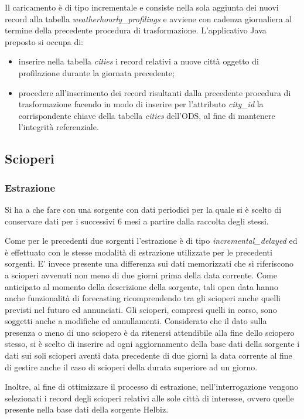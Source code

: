 Il caricamento è di tipo incrementale e consiste nella sola aggiunta dei nuovi
record alla tabella \textit{weather\-hourly\_profilings} e avviene con cadenza
giornaliera al termine della precedente procedura di trasformazione.
L'applicativo Java preposto si occupa di:
\begin{itemize}
\item inserire nella tabella \textit{cities} i record relativi a nuove città oggetto
di profilazione durante la giornata precedente;
\item procedere all'inserimento dei record risultanti dalla precedente procedura di
trasformazione facendo in modo di inserire per l'attributo \textit{city\_id}
la corrispondente chiave della tabella \textit{cities} dell'ODS, al fine
di mantenere l'integrità referenziale.
\end{itemize}

\subsection{Scioperi}

\subsubsection{Estrazione}

Si ha a che fare con una sorgente con dati periodici per la quale si è scelto di 
conservare dati per i successivi 6 mesi a partire dalla raccolta degli stessi.

Come per le precedenti due sorgenti l'estrazione è di tipo
\textit{incremental\_delayed} ed è effettuato con le stesse modalità di estrazione
utilizzate per le precedenti sorgenti. E' invece presente una differenza sui dati
memorizzati che si riferiscono a scioperi avvenuti non meno di due giorni prima
della data corrente. Come anticipato al momento della descrizione della sorgente,
tali open data hanno anche funzionalità di forecasting ricomprendendo tra gli scioperi
anche quelli previsti nel futuro ed annunciati. Gli scioperi, compresi quelli in corso,
sono soggetti anche a modifiche ed annullamenti. Considerato che il dato sulla
presenza o meno di uno sciopero è da ritenersi attendibile alla fine dello
sciopero stesso, si è scelto di inserire ad ogni aggiornamento della base dati
della sorgente i dati sui soli scioperi aventi data precedente di due giorni la
data corrente al fine di gestire anche il caso di scioperi della durata superiore 
ad un giorno.

Inoltre, al fine di ottimizzare il processo di estrazione, nell'interrogazione
vengono selezionati i record degli scioperi relativi alle sole città di interesse,
ovvero quelle presente nella base dati della sorgente Helbiz.

